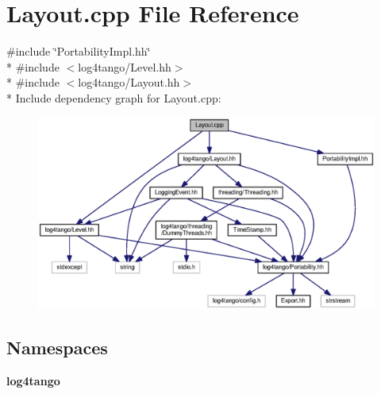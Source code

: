 \section{Layout.\-cpp File Reference}
\label{Layout_8cpp}
{\ttfamily \#include \char`\"{}Portability\-Impl.\-hh\char`\"{}}\\*
{\ttfamily \#include $<$log4tango/\-Level.\-hh$>$}\\*
{\ttfamily \#include $<$log4tango/\-Layout.\-hh$>$}\\*
Include dependency graph for Layout.\-cpp\-:
\nopagebreak
\begin{figure}[H]
\begin{center}
\leavevmode
\includegraphics[width=350pt]{d3/d8d/Layout_8cpp__incl}
\end{center}
\end{figure}
\subsection*{Namespaces}
\begin{DoxyCompactItemize}
\item 
{\bf log4tango}
\end{DoxyCompactItemize}
